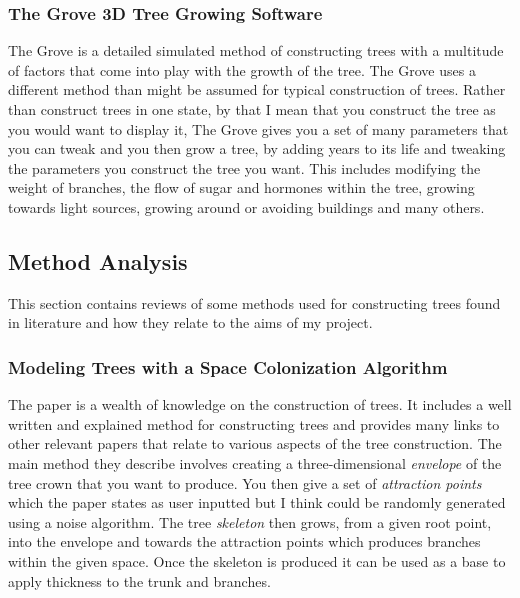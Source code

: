 \documentclass[proposal]{cmpreport}
\begin{document}
\subsubsection{The Grove 3D Tree Growing Software}
The Grove \cite{thegrove} is a detailed simulated method of constructing trees with a 
multitude of factors that come into play with the growth of the tree. The Grove uses a 
different method than might be assumed for typical construction of trees. Rather than 
construct trees in one state, by that I mean that you construct the tree as you would 
want to display it, The Grove gives you a set of many parameters that you can tweak and 
you then grow a tree, by adding years to its life and tweaking the parameters you 
construct the tree you want. This includes modifying the weight of branches, the flow 
of sugar and hormones within the tree, growing towards light sources, growing around 
or avoiding buildings and many others.

\pagebreak
\subsection{Method Analysis}
This section contains reviews of some methods used for constructing trees found in 
literature and how they relate to the aims of my project.

\subsubsection{Modeling Trees with a Space Colonization Algorithm}
The paper \cite{colonization} is a wealth of knowledge on the construction of trees. 
It includes a well written and explained method for constructing trees and provides 
many links to other relevant papers that relate to various aspects of the tree 
construction. The main method they describe involves creating a three-dimensional 
\textit{envelope} of the tree crown that you want to produce. You then give a set of 
\textit{attraction points} which the paper states as user inputted but I think could be 
randomly generated using a noise algorithm. The tree \textit{skeleton} then grows, from a 
given root point, into the envelope and towards the attraction points which produces 
branches within the given space. Once the skeleton is produced it can be used as a 
base to apply thickness to the trunk and branches.
\end{document}
